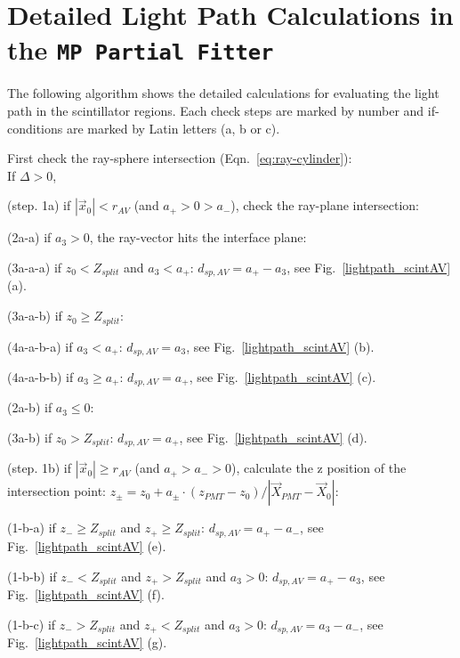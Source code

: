 \section{Detailed Light Path Calculations in the \texttt{MP Partial Fitter}}\label{appendix:lightpath}
The following algorithm shows the detailed calculations for evaluating the light path in the scintillator regions. Each check steps are marked by number and if-conditions are marked by Latin letters (a, b or c). 

\begin{algorithm}
	First check the ray-sphere intersection (Eqn.~\ref{eq:ray-cylinder}):\\
	If {$\Delta>0$}, 
	
	\hspace{2mm}(step. 1a) if $|\vec{x}_0|<r_{AV}$ (and $a_+>0>a_-$), check the ray-plane intersection:
	
	\hspace{4mm}(2a-a) if $a_3>0$, the ray-vector hits the interface plane: 
	
	\hspace{6mm}(3a-a-a) if $z_0<Z_{split}$ and $a_3<a_+$: $d_{sp,AV}=a_+-a_3$, see Fig.~\ref{lightpath_scintAV} (a).
	
	\hspace{6mm}(3a-a-b) if $z_0\geq Z_{split}$:
	
	\hspace{8mm}(4a-a-b-a) if $a_3<a_+$:  $d_{sp,AV}=a_3$, see Fig.~\ref{lightpath_scintAV} (b). 
	
	\hspace{8mm}(4a-a-b-b) if $a_3\geq a_+$:  $d_{sp,AV}=a_+$, see Fig.~\ref{lightpath_scintAV} (c).
	
	\hspace{4mm}(2a-b) if $a_3\leq0$:
	
	\hspace{6mm}(3a-b) if $z_0>Z_{split}$: $d_{sp,AV}=a_+$, see Fig.~\ref{lightpath_scintAV} (d).
	
	\hspace{2mm}(step. 1b) if $|\vec{x}_0|\geq r_{AV}$ (and $a_+>a_->0$), calculate the z position of the intersection point: $z_{\pm}=z_0+a_\pm\cdot(z_{PMT}-z_0)/|\vec{X}_{PMT}-\vec{X}_0|$:
	
	\hspace{4mm}(1-b-a) if $z_- \geq Z_{split}$ and $z_+\geq Z_{split}$: $d_{sp,AV} = a_+ - a_-$, see Fig.~\ref{lightpath_scintAV} (e).
	
	\hspace{4mm}(1-b-b) if $z_-< Z_{split}$ and $z_+> Z_{split}$ and $a_3>0$: $d_{sp,AV} = a_+ - a_3$, see Fig.~\ref{lightpath_scintAV} (f).
	
	\hspace{4mm}(1-b-c) if $z_->Z_{split}$ and $z_+<Z_{split}$ and $a_3>0$: $d_{sp,AV}= a_3 - a_-$, see Fig.~\ref{lightpath_scintAV} (g).
\end{algorithm}

